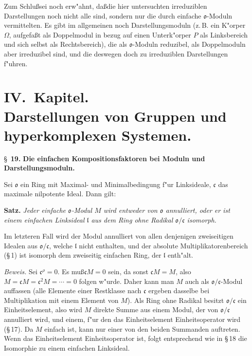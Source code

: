 \documentclass[12pt,a4paper]{article}
\theoremstyle{plain}
\begin{document}
Zum Schlu\ss sei noch erw"ahnt, da\ss die hier untersuchten irreduziblen Darstellungen noch nicht alle sind, sondern nur die durch einfache $\mathfrak{o}$-Moduln vermittelten. Es gibt im allgemeinen noch Darstellungsmoduln (z.\,B. ein K"orper $\Omega$, aufgefa\ss t als Doppelmodul in bezug auf einen Unterk"orper $P$ als Linksbereich und sich selbst als Rechtsbereich), die als $\mathfrak{o}$-Moduln reduzibel, als Doppelmoduln aber irreduzibel sind, und die deswegen doch zu irreduziblen Darstellungen f"uhren.

\newpage
\section*{IV.\ Kapitel.\\[4pt] Darstellungen von Gruppen und hyperkomplexen Systemen.}
\setcounter{section}{18}

\S~\textbf{19.}
\textbf{Die einfachen Kompositionsfaktoren bei Moduln und Darstellungsmoduln.}

\smallskip

\noindent
Sei $\mathfrak{o}$ ein Ring mit Maximal- und Minimalbedingung f"ur Linksideale, $\mathfrak{c}$ das maximale nilpotente Ideal. Dann gilt:

\medskip\noindent\textbf{Satz.}
\textit{Jeder einfache $\mathfrak{o}$-Modul $M$ wird entweder von $\mathfrak{o}$ annulliert, oder er ist einem einfachen Linksideal $\mathfrak{l}$ aus dem Ring ohne Radikal $\mathfrak{o}/\mathfrak{c}$ isomorph.}

Im letzteren Fall wird der Modul annulliert von allen denjenigen zweiseitigen Idealen aus $\mathfrak{o}/\mathfrak{c}$, welche $\mathfrak{l}$ nicht enthalten, und der absolute Multiplikatorenbereich (\S\,1) ist isomorph dem zweiseitig einfachen Ring, der $\mathfrak{l}$ enth"alt.

\noindent\textit{Beweis.}
Sei $\mathfrak{c}^\rho = 0$. Es mu\ss $\mathfrak{c}M = 0$ sein, da sonst $\mathfrak{c}M = M$, also $M = \mathfrak{c}M = \mathfrak{c}^2M = \cdots = 0$ folgen w"urde. Daher kann man $M$ auch als $\mathfrak{o}/\mathfrak{c}$-Modul auffassen (alle Elemente einer Restklasse nach $\mathfrak{c}$ ergeben dasselbe bei Multiplikation mit einem Element von $M$). Als Ring ohne Radikal besitzt $\mathfrak{o}/\mathfrak{c}$ ein Einheitselement, also wird $M$ direkte Summe aus einem Modul, der von $\mathfrak{o}/\mathfrak{c}$ annulliert wird, und einem, f"ur den das Einheitselement Einheitsoperator wird (\S\,17). Da $M$ einfach ist, kann nur einer von den beiden Summanden auftreten. Wenn das Einheitselement Einheitsoperator ist, folgt entsprechend wie in \S\,18 die Isomorphie zu einem einfachen Linksideal.
\end{document}
